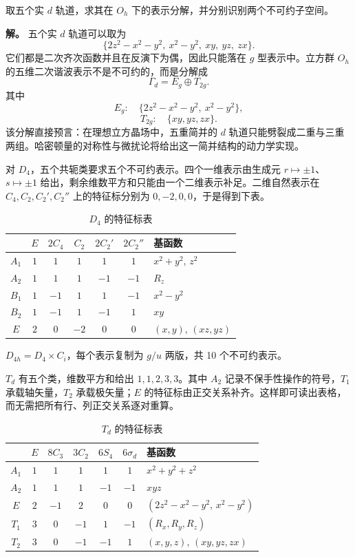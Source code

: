 \begin{example}
取五个实 $d$ 轨道，求其在 $O_h$ 下的表示分解，并分别识别两个不可约子空间。

\textbf{解。} 五个实 $d$ 轨道可以取为
\[
\{2z^2-x^2-y^2,\ x^2-y^2,\ xy,\ yz,\ zx\}.
\]
它们都是二次齐次函数并且在反演下为偶，因此只能落在 $g$ 型表示中。立方群 $O_h$ 的五维二次谐波表示不是不可约的，而是分解成
\[
\Gamma_{d}=E_g\oplus T_{2g}.
\]
其中
\[
E_g:\quad \{2z^2-x^2-y^2,\ x^2-y^2\},
\]
\[
T_{2g}:\quad \{xy,yz,zx\}.
\]
该分解直接预言：在理想立方晶场中，五重简并的 $d$ 轨道只能劈裂成二重与三重两组。哈密顿量的对称性与微扰论将给出这一简并结构的动力学实现。
\label{ex:oh-d-orbitals}
\end{example}

对 $D_4$，五个共轭类要求五个不可约表示。四个一维表示由生成元 $r\mapsto\pm1$、$s\mapsto\pm1$ 给出，剩余维数平方和只能由一个二维表示补足。二维自然表示在 $C_4,C_2,C_2',C_2''$ 上的特征标分别为 $0,-2,0,0$，于是得到下表。

\begin{table}[htbp]

\centering
\caption{$D_4$ 的特征标表}
\label{tab:d4-character}
\small
\begin{tabular}{c|ccccc|l}
\toprule
 & $E$ & $2C_4$ & $C_2$ & $2C_2'$ & $2C_2''$ & 基函数 \\
\midrule
$A_1$ & $1$&$1$&$1$&$1$&$1$ & $x^2+y^2,\,z^2$ \\
$A_2$ & $1$&$1$&$1$&$-1$&$-1$ & $R_z$ \\
$B_1$ & $1$&$-1$&$1$&$1$&$-1$ & $x^2-y^2$ \\
$B_2$ & $1$&$-1$&$1$&$-1$&$1$ & $xy$ \\
$E$   & $2$&$0$&$-2$&$0$&$0$ & $(x,y),\,(xz,yz)$ \\
\bottomrule
\end{tabular}

\end{table}

$D_{4h}=D_4\times C_i$，每个表示复制为 $g/u$ 两版，共 10 个不可约表示。

$T_d$ 有五个类，维数平方和给出 $1,1,2,3,3$。其中 $A_2$ 记录不保手性操作的符号，$T_1$ 承载轴矢量，$T_2$ 承载极矢量；$E$ 的特征标由正交关系补齐。这样即可读出表格，而无需把所有行、列正交关系逐对重算。

\begin{table}[htbp]

\centering
\caption{$T_d$ 的特征标表}
\label{tab:td-character}
\begin{tabular}{c|ccccc|l}
\toprule
 & $E$ & $8C_3$ & $3C_2$ & $6S_4$ & $6\sigma_d$ & 基函数 \\
\midrule
$A_1$ & $1$&$1$&$1$&$1$&$1$ & $x^2+y^2+z^2$ \\
$A_2$ & $1$&$1$&$1$&$-1$&$-1$ & $xyz$ \\
$E$   & $2$&$-1$&$2$&$0$&$0$ & $(2z^2-x^2-y^2,\,x^2-y^2)$ \\
$T_1$ & $3$&$0$&$-1$&$1$&$-1$ & $(R_x,R_y,R_z)$ \\
$T_2$ & $3$&$0$&$-1$&$-1$&$1$ & $(x,y,z),\,(xy,yz,zx)$ \\
\bottomrule
\end{tabular}

\end{table}

